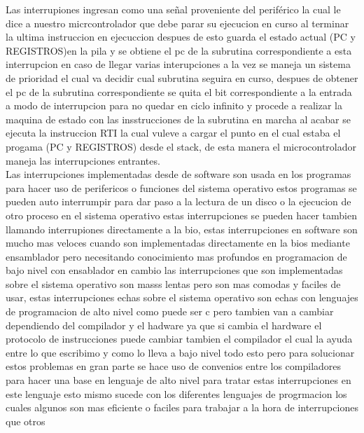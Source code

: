 \documentclass[a4paper]{article}
\begin{document}
Las interrupiones ingresan como una señal proveniente del periférico la cual le dice a nuestro micrcontrolador que debe parar su ejecucion en curso al terminar la ultima instruccion en ejecuccion despues de esto guarda el estado actual (PC y REGISTROS)en la pila y se obtiene el pc de la subrutina correspondiente a esta interrupcion en caso de llegar varias interupciones a la vez se maneja un sistema de prioridad el cual va decidir cual subrutina seguira en curso, despues de obtener el pc de la subrutina correspondiente se quita el bit correspondiente a la entrada a modo de interrupcion para no quedar en ciclo infinito  y procede a realizar la maquina de estado con las insstrucciones de la subrutina en marcha al acabar se ejecuta la instruccion RTI la cual vuleve a cargar el punto en el cual estaba el progama (PC y REGISTROS) desde el stack, de esta manera el microcontrolador maneja las interrupciones entrantes.
\\
Las interrupciones implementadas desde de software  son usada en los programas para hacer uso de perifericos o funciones del sistema operativo estos programas se pueden auto interrumpir para dar paso a la lectura de un disco o la ejecucion de otro proceso en el sistema operativo estas interrupciones se pueden hacer tambien llamando interrupiones directamente a la bio, estas interrupciones en software son mucho mas veloces cuando son implementadas directamente en la bios mediante ensamblador pero  necesitando conocimiento mas profundos en programacion de bajo nivel con ensablador en cambio las interrupciones que son implementadas sobre el sistema operativo son masss lentas pero son mas comodas y faciles de usar, estas interrupciones echas sobre el sistema operativo son echas con lenguajes de programacion de alto nivel como puede ser c pero tambien van a cambiar dependiendo del compilador y el hadware ya que si cambia el hardware el protocolo de instrucciones puede cambiar tambien el compilador el cual la ayuda entre lo que escribimo y como lo lleva a bajo nivel todo esto pero para solucionar estos problemas en gran parte se hace uso de convenios entre los compiladores para hacer una base en lenguaje de alto nivel para tratar estas interrupciones en este lenguaje esto mismo sucede con los diferentes lenguajes de progrmacion los cuales algunos son mas eficiente o faciles para trabajar a la hora de interrupciones que otros
\end{document}
